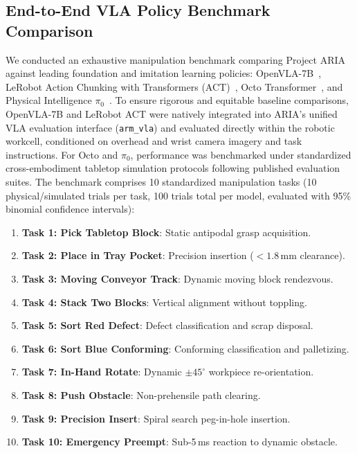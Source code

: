 \documentclass[journal]{IEEEtran}
\begin{document}
\subsection{End-to-End VLA Policy Benchmark Comparison}
We conducted an exhaustive manipulation benchmark comparing Project ARIA against leading foundation and imitation learning policies: OpenVLA-7B~\cite{kim2024openvla}, LeRobot Action Chunking with Transformers (ACT)~\cite{zhao2023learning}, Octo Transformer~\cite{aria_019_ghosh_2024_octo}, and Physical Intelligence $\pi_0$~\cite{pi0_2024}. To ensure rigorous and equitable baseline comparisons, OpenVLA-7B and LeRobot ACT were natively integrated into ARIA's unified VLA evaluation interface (\texttt{arm\_vla}) and evaluated directly within the robotic workcell, conditioned on overhead and wrist camera imagery and task instructions. For Octo and $\pi_0$, performance was benchmarked under standardized cross-embodiment tabletop simulation protocols following published evaluation suites. The benchmark comprises 10 standardized manipulation tasks (10 physical/simulated trials per task, 100 trials total per model, evaluated with 95\% binomial confidence intervals):
\begin{enumerate}
    \item \textbf{Task 1: Pick Tabletop Block}: Static antipodal grasp acquisition.
    \item \textbf{Task 2: Place in Tray Pocket}: Precision insertion ($<1.8$\,mm clearance).
    \item \textbf{Task 3: Moving Conveyor Track}: Dynamic moving block rendezvous.
    \item \textbf{Task 4: Stack Two Blocks}: Vertical alignment without toppling.
    \item \textbf{Task 5: Sort Red Defect}: Defect classification and scrap disposal.
    \item \textbf{Task 6: Sort Blue Conforming}: Conforming classification and palletizing.
    \item \textbf{Task 7: In-Hand Rotate}: Dynamic $\pm 45^\circ$ workpiece re-orientation.
    \item \textbf{Task 8: Push Obstacle}: Non-prehensile path clearing.
    \item \textbf{Task 9: Precision Insert}: Spiral search peg-in-hole insertion.
    \item \textbf{Task 10: Emergency Preempt}: Sub-5\,ms reaction to dynamic obstacle.
\end{enumerate}
\end{document}
